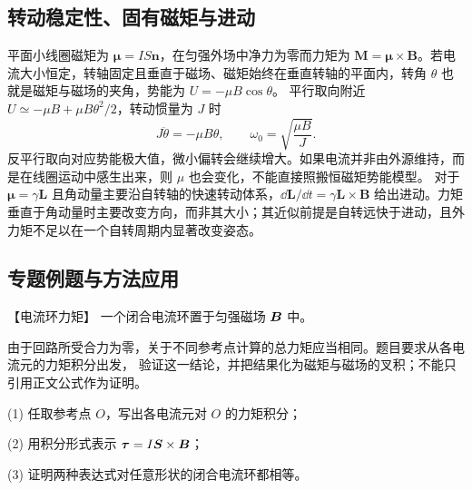 {%
\subsection{转动稳定性、固有磁矩与进动}
平面小线圈磁矩为 $\boldsymbol\mu=IS\boldsymbol n$，在匀强外场中净力为零而力矩为 $\boldsymbol M=\boldsymbol\mu\times\boldsymbol B$。若电流大小恒定，转轴固定且垂直于磁场、磁矩始终在垂直转轴的平面内，转角 $\theta$ 也就是磁矩与磁场的夹角，势能为 $U=-\mu B\cos\theta$。
平行取向附近 $U\simeq-\mu B+\mu B\theta^2/2$，转动惯量为 $J$ 时
\[
 J\ddot\theta=-\mu B\theta,\qquad \omega_0=\sqrt{\frac{\mu B}{J}}.
\]
反平行取向对应势能极大值，微小偏转会继续增大。如果电流并非由外源维持，而是在线圈运动中感生出来，则 $\mu$ 也会变化，不能直接照搬恒磁矩势能模型。
对于 $\boldsymbol\mu=\gamma\boldsymbol L$ 且角动量主要沿自转轴的快速转动体系，$\dd\boldsymbol L/\dd t=\gamma\boldsymbol L\times\boldsymbol B$ 给出进动。力矩垂直于角动量时主要改变方向，而非其大小；其近似前提是自转远快于进动，且外力矩不足以在一个自转周期内显著改变姿态。


\subsection{专题例题与方法应用}

\begin{origexamplebox}{【电流环力矩】}\label{ch23:ex:s39-8-7}
一个闭合电流环置于匀强磁场 $\bm{B}$ 中。

由于回路所受合力为零，关于不同参考点计算的总力矩应当相同。题目要求从各电流元的力矩积分出发，
验证这一结论，并把结果化为磁矩与磁场的叉积；不能只引用正文公式作为证明。

(1) 任取参考点 $O$，写出各电流元对 $O$ 的力矩积分；

(2) 用积分形式表示 $\bm{\tau}=I\bm{S}\times\bm{B}$；

(3) 证明两种表达式对任意形状的闭合电流环都相等。

\begin{center}\end{center}
\end{origexamplebox}

}
